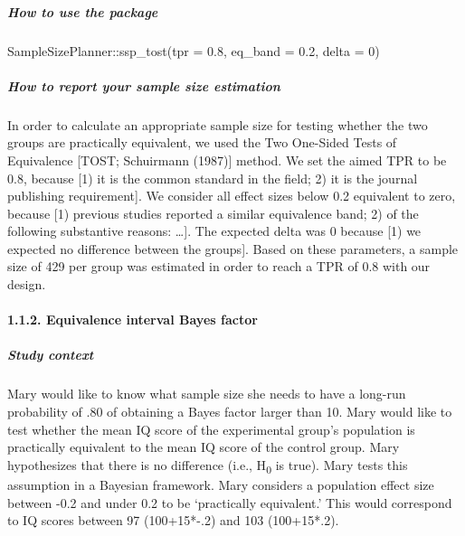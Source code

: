 \documentclass[
  english,
  man,floatsintext]{apa6}
\newenvironment{Shaded}{\begin{snugshade}}{\end{snugshade}}
\newcommand{\AttributeTok}[1]{\textcolor[rgb]{0.77,0.63,0.00}{#1}}
\newcommand{\DecValTok}[1]{\textcolor[rgb]{0.00,0.00,0.81}{#1}}
\newcommand{\FloatTok}[1]{\textcolor[rgb]{0.00,0.00,0.81}{#1}}
\newcommand{\FunctionTok}[1]{\textcolor[rgb]{0.00,0.00,0.00}{#1}}
\newcommand{\NormalTok}[1]{#1}
\newcommand{\SpecialCharTok}[1]{\textcolor[rgb]{0.00,0.00,0.00}{#1}}
\let\oldparagraph\paragraph
\renewcommand{\paragraph}[1]{\oldparagraph{#1}\mbox{}}
\let\oldsubparagraph\subparagraph
\renewcommand{\subparagraph}[1]{\oldsubparagraph{#1}\mbox{}}
\begin{document}
\hypertarget{how-to-use-the-package}{%
\subparagraph{How to use the package}\label{how-to-use-the-package}}

\begin{Shaded}
\begin{Highlighting}[]
\NormalTok{SampleSizePlanner}\SpecialCharTok{::}\FunctionTok{ssp\_tost}\NormalTok{(}\AttributeTok{tpr =} \FloatTok{0.8}\NormalTok{, }\AttributeTok{eq\_band =} \FloatTok{0.2}\NormalTok{, }\AttributeTok{delta =} \DecValTok{0}\NormalTok{)}
\end{Highlighting}
\end{Shaded}

\hypertarget{how-to-report-your-sample-size-estimation}{%
\subparagraph{How to report your sample size estimation}\label{how-to-report-your-sample-size-estimation}}

In order to calculate an appropriate sample size for testing whether the two groups are practically equivalent, we used the Two One-Sided Tests of Equivalence {[}TOST; Schuirmann (1987){]} method. We set the aimed TPR to be 0.8, because {[}1) it is the common standard in the field; 2) it is the journal publishing requirement{]}. We consider all effect sizes below 0.2 equivalent to zero, because {[}1) previous studies reported a similar equivalence band; 2) of the following substantive reasons: \ldots{]}. The expected delta was 0 because {[}1) we expected no difference between the groups{]}. Based on these parameters, a sample size of 429 per group was estimated in order to reach a TPR of 0.8 with our design.

\hypertarget{equivalence-interval-bayes-factor}{%
\paragraph{1.1.2. Equivalence interval Bayes factor}\label{equivalence-interval-bayes-factor}}

\hypertarget{study-context-1}{%
\subparagraph{Study context}\label{study-context-1}}

Mary would like to know what sample size she needs to have a long-run probability of .80 of obtaining a Bayes factor larger than 10. Mary would like to test whether the mean IQ score of the experimental group's population is practically equivalent to the mean IQ score of the control group. Mary hypothesizes that there is no difference (i.e., H\textsubscript{0} is true). Mary tests this assumption in a Bayesian framework. Mary considers a population effect size between -0.2 and under 0.2 to be `practically equivalent.' This would correspond to IQ scores between 97 (100+15*-.2) and 103 (100+15*.2).
\end{document}
